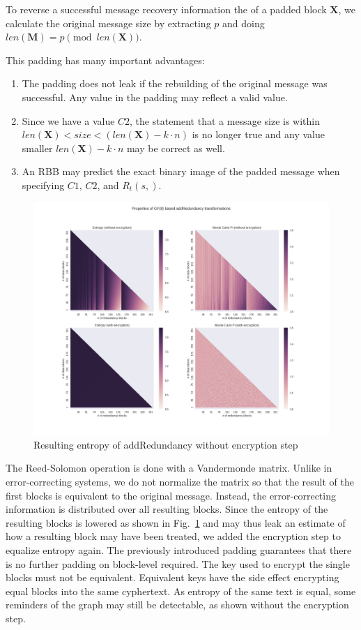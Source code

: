 \documentclass[acmsmall, screen, review]{acmart}
\begin{document}
To reverse a successful message recovery information the of a padded block $\mathbf{X}$, we calculate the original message size by extracting $p$ and doing $len(\mathbf{M})=p \pmod{ len(\mathbf{X})}$.

This padding has many important advantages:
\begin{enumerate}
	\item The padding does not leak if the rebuilding of the original message was successful. Any value in the padding may reflect a valid value.
	\item Since we have a value $C2$, the statement that a message size is within $len(\mathbf{X})<size<(len(\mathbf{X})-k\cdot n)$ is no longer true and any value smaller $len(\mathbf{X})-k\cdot n$ may be correct as well.
	\item An RBB may predict the exact binary image of the padded message when specifying $C1$, $C2$, and $R_{t}(s,)$.
\end{enumerate}

\begin{figure}[ht]\centering
	\includegraphics[width=1\columnwidth]{randomblock_10kb}
	\caption{Resulting entropy of addRedundancy without encryption step}
	\label{fig:entropy}
\end{figure}


The Reed-Solomon operation is done with a Vandermonde matrix. Unlike in error-correcting systems, we do not normalize the matrix so that the result of the first blocks is equivalent to the original message. Instead, the error-correcting information is distributed over all resulting blocks. Since the entropy of the resulting blocks is lowered as shown in Fig.~\ref{fig:entropy} and may thus leak an estimate of how a resulting block may have been treated, we added the encryption step to equalize entropy again. The previously introduced padding guarantees that there is no further padding on block-level required. The key used to encrypt the single blocks must not be equivalent. Equivalent keys have the side effect encrypting equal blocks into the same cyphertext. As entropy of the same text is equal, some reminders of the graph may still be detectable, as shown without the encryption step.
\end{document}
